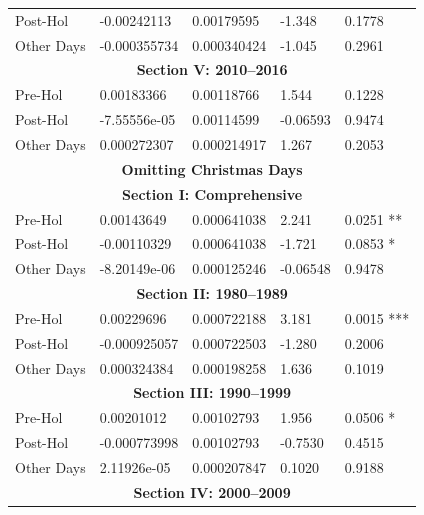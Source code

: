 \documentclass[11pt, english]{article}
\begin{document}
\begin{center}
\begin{longtable}{p{2cm}p{2cm}p{2cm}p{2cm}p{2cm}}
                Post-Hol & -0.00242113 & 0.00179595 & -1.348 & 0.1778\\  
                Other Days & -0.000355734 & 0.000340424 & -1.045 & 0.2961\\
                \hline 
                \multicolumn{5}{c}{\textbf{Section V: 2010--2016}}\\   
                \hline            
                Pre-Hol & 0.00183366 & 0.00118766 & 1.544 & 0.1228\\ 
                Post-Hol & -7.55556e-05 & 0.00114599 & -0.06593 & 0.9474\\  
                Other Days & 0.000272307 & 0.000214917 & 1.267 & 0.2053\\
                \hline 
                \hline                                          
                \multicolumn{5}{c}{\textbf{Omitting Christmas Days}}\\ 
                \hline
                \hline
                \multicolumn{5}{c}{\textbf{Section I: Comprehensive}}\\
                \hline
                Pre-Hol & 0.00143649 & 0.000641038 & 2.241 & 0.0251 **\\
                Post-Hol & -0.00110329 & 0.000641038 & -1.721 & 0.0853 *\\
                Other Days & -8.20149e-06 & 0.000125246 & -0.06548 & 0.9478\\
                \hline
                \multicolumn{5}{c}{\textbf{Section II: 1980--1989}}\\
                \hline
                Pre-Hol & 0.00229696 & 0.000722188 & 3.181 & 0.0015 ***\\
                Post-Hol & -0.000925057 & 0.000722503 & -1.280 & 0.2006\\  
                Other Days & 0.000324384 & 0.000198258 & 1.636 & 0.1019\\
                \hline 
                \multicolumn{5}{c}{\textbf{Section III: 1990--1999}}\\   
                \hline            
                Pre-Hol & 0.00201012 & 0.00102793 & 1.956 & 0.0506 *\\ 
                Post-Hol & -0.000773998 & 0.00102793 & -0.7530 & 0.4515\\  
                Other Days & 2.11926e-05 & 0.000207847 & 0.1020 & 0.9188\\
		\hline 
                \multicolumn{5}{c}{\textbf{Section IV: 2000--2009}}\\

\end{longtable}
\end{center}
\end{document}
